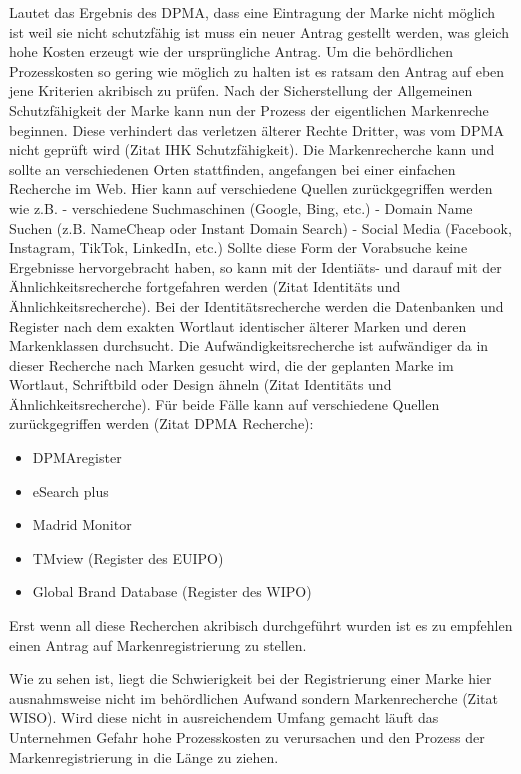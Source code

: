 Lautet das Ergebnis des DPMA, dass eine Eintragung der Marke nicht möglich ist weil sie nicht schutzfähig ist muss ein neuer Antrag gestellt werden, was gleich hohe Kosten erzeugt wie der ursprüngliche Antrag. Um die behördlichen Prozesskosten so gering wie möglich zu halten ist es ratsam den Antrag auf eben jene Kriterien akribisch zu prüfen.
Nach der Sicherstellung der Allgemeinen Schutzfähigkeit der Marke kann nun der Prozess der eigentlichen Markenreche beginnen. Diese verhindert das verletzen älterer Rechte Dritter, was vom DPMA nicht geprüft wird (Zitat IHK Schutzfähigkeit). Die Markenrecherche kann und sollte an verschiedenen Orten stattfinden, angefangen bei einer einfachen Recherche im Web. Hier kann auf verschiedene Quellen zurückgegriffen werden wie z.B. 
- verschiedene Suchmaschinen (Google, Bing, etc.)
- Domain Name Suchen (z.B. NameCheap oder Instant Domain Search)
- Social Media (Facebook, Instagram, TikTok, LinkedIn, etc.)
Sollte diese Form der Vorabsuche keine Ergebnisse hervorgebracht haben, so kann mit der Identiäts- und darauf mit der Ähnlichkeitsrecherche fortgefahren werden (Zitat Identitäts und Ähnlichkeitsrecherche). Bei der Identitätsrecherche werden die Datenbanken und Register nach dem exakten Wortlaut identischer älterer Marken und deren Markenklassen durchsucht. Die Aufwändigkeitsrecherche ist aufwändiger da in dieser Recherche nach Marken gesucht wird, die der geplanten Marke im Wortlaut, Schriftbild oder Design ähneln (Zitat Identitäts und Ähnlichkeitsrecherche). Für beide Fälle kann auf verschiedene Quellen zurückgegriffen werden (Zitat DPMA Recherche):

\begin{itemize}
    \item DPMAregister
    \item eSearch plus
    \item Madrid Monitor
    \item TMview (Register des EUIPO)
    \item Global Brand Database (Register des WIPO)
\end{itemize}

Erst wenn all diese Recherchen akribisch durchgeführt wurden ist es zu empfehlen einen Antrag auf Markenregistrierung zu stellen.

Wie zu sehen ist, liegt die Schwierigkeit bei der Registrierung einer Marke hier ausnahmsweise nicht im behördlichen Aufwand sondern Markenrecherche (Zitat WISO). Wird diese nicht in ausreichendem Umfang gemacht läuft das Unternehmen Gefahr hohe Prozesskosten zu verursachen und den Prozess der Markenregistrierung in die Länge zu ziehen. 